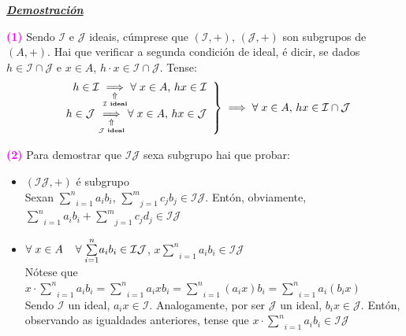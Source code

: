\documentclass[twoside]{report}
\newcommand{\magbf}[1]{\textcolor{magenta}{\textbf{#1}}} %
\theoremstyle{mystyle}
\begin{document}
\vspace{2mm}

\noindent \textbf{\textit{\underline{Demostración}}}

\vspace{2mm}

\noindent \magbf{(1)} Sendo $\mathcal{I}$ e $\mathcal{J}$ ideais, cúmprese que $(\mathcal{I}, +) \text{, } (\mathcal{J}, +)$ son subgrupos de $(A, +)$. Hai que verificar a segunda condición de ideal, é dicir, se dados $h \in \mathcal{I}\cap\mathcal{J}$ e $x \in A$, $h \cdot x \in \mathcal{I}\cap\mathcal{J}$. Tense:
\[ 
\left. \begin{array}{r} 
h \in \mathcal{I} \underset{\underset{\mathcal{I} \textbf{ ideal}}{\Uparrow}}{\implies} \forall \hspace{1mm} x \in A \text{, } hx \in \mathcal{I}\\[1ex]
h \in \mathcal{J} \underset{\underset{\mathcal{J} \textbf{ ideal}}{\Uparrow}}{\implies} \forall \hspace{1mm} x \in A \text{, } hx \in \mathcal{J}
\end{array} \right\} 
\implies \forall \hspace{1mm} x \in A \text{, } hx \in \mathcal{I \cap J}
\]

\vspace{3mm}

\noindent \magbf{(2)} Para demostrar que $\mathcal{IJ}$ sexa subgrupo hai que probar:
\begin{itemize}
    \item $(\mathcal{IJ}, +)$ é subgrupo\\
    
    Sexan $\underset{i = 1}{\overset{n}{\sum}}{a_{i}b_{i}}$, $\underset{j = 1}{\overset{m}{\sum}}{c_{j}b_{j}} \in \mathcal{IJ}$. Entón, obviamente, $\underset{i = 1}{\overset{n}{\sum}}{a_{i}b_{i}} + \underset{j = 1}{\overset{m}{\sum}}{c_{j}d_{j}} \in \mathcal{IJ}$
    
    \item $\forall \hspace{1mm} x \in A \hspace{4mm} \forall \hspace{1mm} \underset{i = 1}{\overset{n}{\sum}}{a_{i}b_{i}} \in \mathcal{IJ}$, \hspace{3mm} $x\underset{i = 1}{\overset{n}{\sum}}{a_{i}b_{i}} \in \mathcal{IJ}$\\
    
    Nótese que $x \cdot \underset{i = 1}{\overset{n}{\sum}}{a_{i}b_{i}} = \underset{i = 1}{\overset{n}{\sum}}{a_{i}xb_{i}} = \underset{i = 1}{\overset{n}{\sum}}{(a_{i}x)b_{i}} = \underset{i = 1}{\overset{n}{\sum}}{a_{i}(b_{i}x)}$\\
    
    Sendo $\mathcal{I}$ un ideal, $a_{i}x \in \mathcal{I}$. Analogamente, por ser $\mathcal{J}$ un ideal, $b_{i}x \in \mathcal{J}$. Entón, observando as igualdades anteriores, tense que $x \cdot \underset{i = 1}{\overset{n}{\sum}}{a_{i}b_{i}} \in \mathcal{IJ}$\\
\end{itemize}
\end{document}
